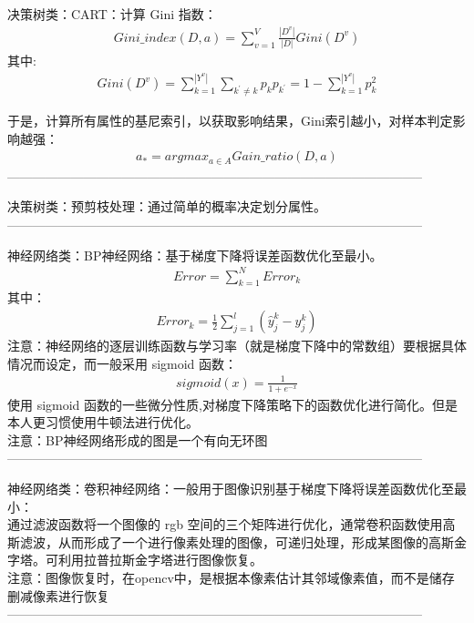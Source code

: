 \documentclass{article}
\begin{document}
\noindent 决策树类：CART：计算 Gini 指数：
\begin{eqnarray*}
Gini\_index(D,a) = \sum_{v=1}^{V}\frac{|D^{v}|}{|D|}Gini(D^{v})
\end{eqnarray*}
其中:
\begin{eqnarray*}
Gini(D^{v}) = \sum_{k=1}^{|Y^{v}|}\sum_{k^{'}\ne k}p_{k}p_{k^{'}} = 1 - \sum_{k=1}^{|Y^{v}|}p_{k}^{2}
\end{eqnarray*}

于是，计算所有属性的基尼索引，以获取影响结果，Gini索引越小，对样本判定影响越强：
\begin{eqnarray*}
a_{*} = argmax_{a\in A}Gain\_ratio(D,a)
\end{eqnarray*}
--------------------------------------------------------------------------------------------------

\noindent 决策树类：预剪枝处理：通过简单的概率决定划分属性。\\
--------------------------------------------------------------------------------------------------


\noindent 神经网络类：BP神经网络：基于梯度下降将误差函数优化至最小。\\
\begin{eqnarray*}
Error = \sum_{k=1}^{N} Error_{k}
\end{eqnarray*}
其中：
\begin{eqnarray*}
Error_{k} = \frac{1}{2}\sum_{j=1}^{l}(\hat{y}^{k}_{j}- y^{k}_{j})
\end{eqnarray*}
注意：神经网络的逐层训练函数与学习率（就是梯度下降中的常数组）要根据具体情况而设定，而一般采用 sigmoid 函数：
\begin{eqnarray*}
sigmoid(x) = \frac{1}{1+e^{-x}}
\end{eqnarray*}
使用 sigmoid 函数的一些微分性质,对梯度下降策略下的函数优化进行简化。但是本人更习惯使用牛顿法进行优化。\\
注意：BP神经网络形成的图是一个有向无环图\\
--------------------------------------------------------------------------------------------------


\noindent 神经网络类：卷积神经网络：一般用于图像识别基于梯度下降将误差函数优化至最小：\\
通过滤波函数将一个图像的 rgb 空间的三个矩阵进行优化，通常卷积函数使用高斯滤波，从而形成了一个进行像素处理的图像，可递归处理，形成某图像的高斯金字塔。可利用拉普拉斯金字塔进行图像恢复。\\
注意：图像恢复时，在opencv中，是根据本像素估计其邻域像素值，而不是储存删减像素进行恢复\\
--------------------------------------------------------------------------------------------------
\end{document}
